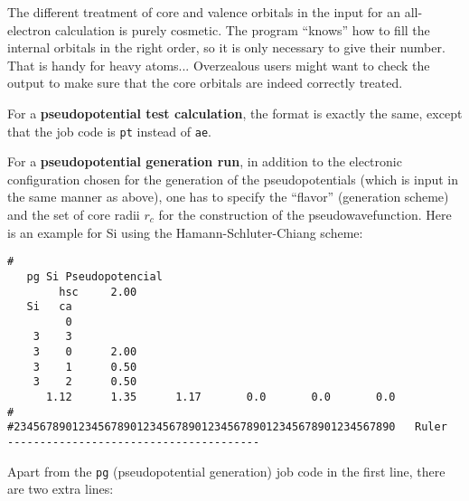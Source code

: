 \documentclass[11pt]{article}
\begin{document}
	
The different treatment of core and valence orbitals in the input for an
all-electron calculation is purely cosmetic. The program ``knows'' how
to fill the internal orbitals in the right order, so it is only
necessary to give their number. That is handy for heavy atoms...
Overzealous users might want to check the output to make sure that the
core orbitals are indeed correctly treated.



For a {\bf pseudopotential test calculation}, the format is exactly
the same, except that the job code is {\tt pt} instead of {\tt ae}. 


For a {\bf pseudopotential generation run}, in addition to the
electronic configuration chosen for the generation of the
pseudopotentials (which is input in the same manner as above), one has
to specify the ``flavor'' (generation scheme) and the set of core
radii $r_c$ for the construction of the pseudowavefunction. Here is an
example for Si using the Hamann-Schluter-Chiang scheme:

\begin{verbatim}
# 
   pg Si Pseudopotencial
        hsc     2.00
   Si   ca
         0
    3    3
    3    0      2.00
    3    1      0.50
    3    2      0.50
      1.12      1.35      1.17       0.0       0.0       0.0
#
#23456789012345678901234567890123456789012345678901234567890   Ruler
---------------------------------------
\end{verbatim}

Apart from the {\tt pg} (pseudopotential generation) job code in the
first line, there are two extra lines:
\end{document}
